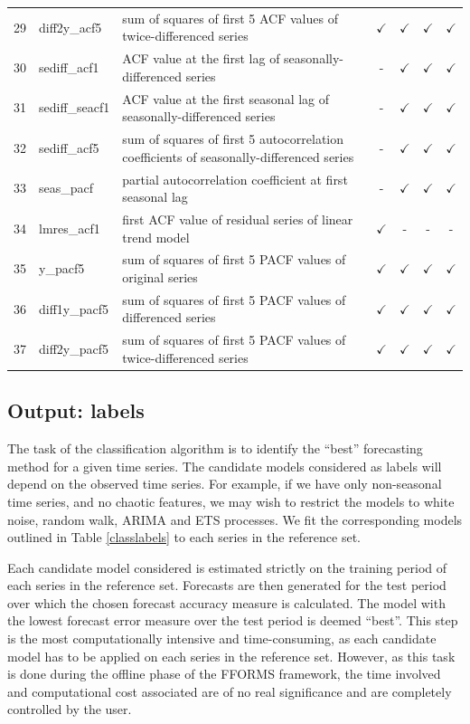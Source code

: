 \documentclass[11pt,a4paper,]{article}
\def\yes{$\checkmark$}
\begin{document}
\begin{table}[!htp]
\begin{tabular}{llp{}cccc}
29 & diff2y\_acf5   & sum of squares of first 5 ACF values of twice-differenced series                        & \yes  & \yes & \yes & \yes \\
30 & sediff\_acf1 & ACF value at the first lag of seasonally-differenced series                               & -     & \yes & \yes & \yes\\
31 & sediff\_seacf1 & ACF value at the first seasonal lag of seasonally-differenced series                    & -     & \yes & \yes & \yes\\
32 & sediff\_acf5   & sum of squares of first 5 autocorrelation coefficients of seasonally-differenced series & -     & \yes & \yes & \yes\\
33 & seas\_pacf     & partial autocorrelation coefficient at first seasonal lag & -     & \yes & \yes & \yes\\
34 & lmres\_acf1    & first ACF value of residual series of linear trend model                                & \yes  & - & - & -\\
35 & y\_pacf5       & sum of squares of first 5 PACF values of original series                                & \yes  & \yes & \yes & \yes\\
36 & diff1y\_pacf5  & sum of squares of first 5 PACF values of differenced series                             & \yes  & \yes & \yes & \yes\\
37 & diff2y\_pacf5  & sum of squares of first 5 PACF values of twice-differenced series                       & \yes  & \yes & \yes & \yes\\
\bottomrule
\end{tabular}
\end{table}

\hypertarget{output-labels}{%
\subsection{Output: labels}\label{output-labels}}

The task of the classification algorithm is to identify the ``best'' forecasting method for a given time series. The candidate models considered as labels will depend on the observed time series. For example, if we have only non-seasonal time series, and no chaotic features, we may wish to restrict the models to white noise, random walk, ARIMA and ETS processes. We fit the corresponding models outlined in Table \ref{classlabels} to each series in the reference set.

Each candidate model considered is estimated strictly on the training period of each series in the reference set. Forecasts are then generated for the test period over which the chosen forecast accuracy measure is calculated. The model with the lowest forecast error measure over the test period is deemed ``best''. This step is the most computationally intensive and time-consuming, as each candidate model has to be applied on each series in the reference set. However, as this task is done during the offline phase of the FFORMS framework, the time involved and computational cost associated are of no real significance and are completely controlled by the user.
\end{document}
